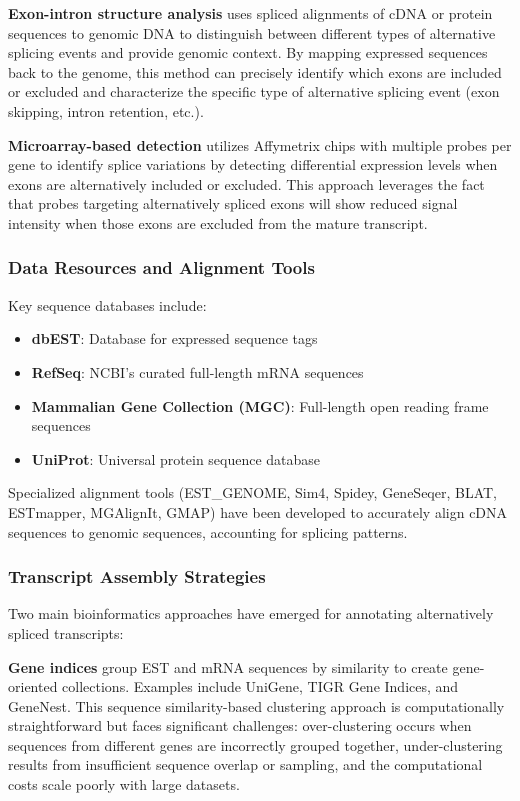 \documentclass[12pt,a4paper]{article}
\begin{document}
\textbf{Exon-intron structure analysis} uses spliced alignments of cDNA or protein sequences to genomic DNA to distinguish between different types of alternative splicing events and provide genomic context. By mapping expressed sequences back to the genome, this method can precisely identify which exons are included or excluded and characterize the specific type of alternative splicing event (exon skipping, intron retention, etc.).

\textbf{Microarray-based detection} utilizes Affymetrix chips with multiple probes per gene to identify splice variations by detecting differential expression levels when exons are alternatively included or excluded. This approach leverages the fact that probes targeting alternatively spliced exons will show reduced signal intensity when those exons are excluded from the mature transcript.

\subsubsection{Data Resources and Alignment Tools}

Key sequence databases include:
\begin{itemize}
    \item \textbf{dbEST}: Database for expressed sequence tags
    \item \textbf{RefSeq}: NCBI's curated full-length mRNA sequences
    \item \textbf{Mammalian Gene Collection (MGC)}: Full-length open reading frame sequences
    \item \textbf{UniProt}: Universal protein sequence database
\end{itemize}

Specialized alignment tools (EST\_GENOME, Sim4, Spidey, GeneSeqer, BLAT, ESTmapper, MGAlignIt, GMAP) have been developed to accurately align cDNA sequences to genomic sequences, accounting for splicing patterns.

\subsubsection{Transcript Assembly Strategies}

Two main bioinformatics approaches have emerged for annotating alternatively spliced transcripts:

\textbf{Gene indices} group EST and mRNA sequences by similarity to create gene-oriented collections. Examples include UniGene, TIGR Gene Indices, and GeneNest. This sequence similarity-based clustering approach is computationally straightforward but faces significant challenges: over-clustering occurs when sequences from different genes are incorrectly grouped together, under-clustering results from insufficient sequence overlap or sampling, and the computational costs scale poorly with large datasets.
\end{document}
